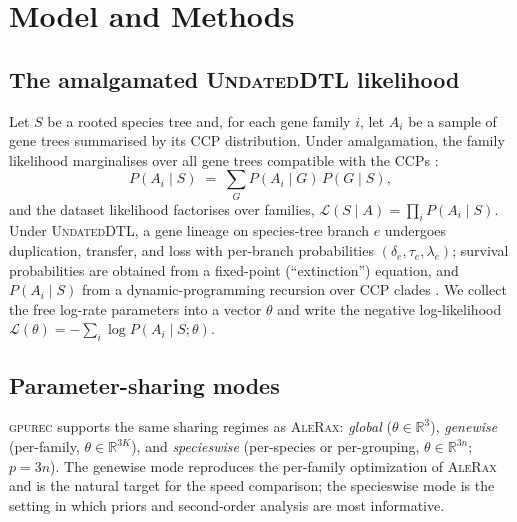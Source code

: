 \documentclass[11pt]{article}
\newcommand{\toolname}{\textsc{gpurec}\xspace}
\newcommand{\bdelta}{\delta}
\newcommand{\btau}{\tau}
\newcommand{\blambda}{\lambda}
\newcommand{\NLL}{\mathcal{L}}
\newcommand{\Real}{\mathbb{R}}
\begin{document}
\section{Model and Methods}
\label{sec:methods}

\subsection{The amalgamated \textsc{UndatedDTL} likelihood}
\label{sec:lik}
Let $S$ be a rooted species tree and, for each gene family $i$, let $A_i$ be a
sample of gene trees summarised by its CCP distribution. Under amalgamation,
the family likelihood marginalises over all gene trees compatible with the CCPs
\citep{Szollosi2013}:
\begin{equation}
  P(A_i \mid S) \;=\; \sum_{G} P(A_i \mid G)\, P(G \mid S),
  \label{eq:amalg}
\end{equation}
and the dataset likelihood factorises over families,
$\mathcal{L}(S \mid A) = \prod_i P(A_i \mid S)$. Under \textsc{UndatedDTL}, a
gene lineage on species-tree branch $e$ undergoes duplication, transfer, and
loss with per-branch probabilities $(\bdelta_e,\btau_e,\blambda_e)$; survival
probabilities are obtained from a fixed-point (``extinction'') equation, and
$P(A_i\mid S)$ from a dynamic-programming recursion over CCP clades
\citep{Szollosi2013,Morel2020}. We collect the free log-rate parameters into a
vector $\theta$ and write the negative log-likelihood
$\NLL(\theta) = -\sum_i \log P(A_i \mid S;\theta)$.

\subsection{Parameter-sharing modes}
\label{sec:modes}
\toolname supports the same sharing regimes as \textsc{AleRax}: \emph{global}
($\theta\in\Real^{3}$), \emph{genewise} (per-family, $\theta\in\Real^{3K}$),
and \emph{specieswise} (per-species or per-grouping, $\theta\in\Real^{3n}$;
$p=3n$). The genewise mode reproduces the per-family optimization of
\textsc{AleRax} and is the natural target for the speed comparison; the
specieswise mode is the setting in which priors and second-order analysis are
most informative.
\end{document}
